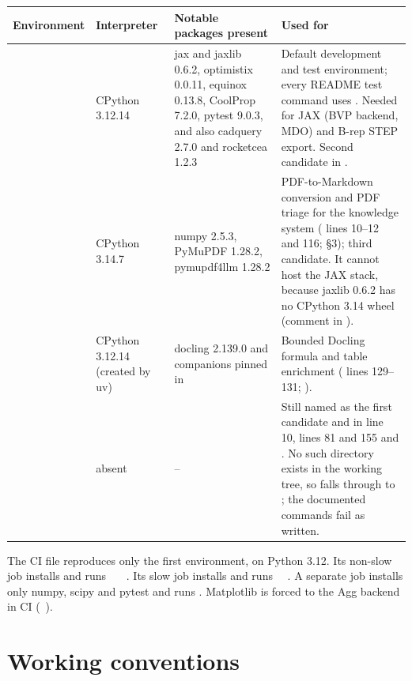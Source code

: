 {\small
\begin{longtable}{P{2.3cm}P{2.3cm}P{5.0cm}P{5.8cm}}
\toprule
Environment & Interpreter & Notable packages present & Used for \\
\midrule
\endhead
{} & CPython 3.12.14 & jax and jaxlib 0.6.2, optimistix 0.0.11, equinox 0.13.8, CoolProp 7.2.0, pytest 9.0.3, and also cadquery 2.7.0 and rocketcea 1.2.3 & Default development and test environment; every README test command uses . Needed for JAX (BVP backend, MDO) and B-rep STEP export. Second candidate in . \\
 & CPython 3.14.7 & numpy 2.5.3, PyMuPDF 1.28.2, pymupdf4llm 1.28.2 & PDF-to-Markdown conversion and PDF triage for the knowledge system ( lines 10--12 and 116;  §3); third  candidate. It cannot host the JAX stack, because jaxlib 0.6.2 has no CPython 3.14 wheel (comment in ). \\
 & CPython 3.12.14 (created by uv) & docling 2.139.0 and companions pinned in  & Bounded Docling formula and table enrichment ( lines 129--131; ). \\
 & absent & -- & Still named as the first  candidate and in  line 10,  lines 81 and 155 and . No such directory exists in the working tree, so  falls through to ; the documented  commands fail as written. \\
\bottomrule
\end{longtable}}

The CI file  reproduces only the first environment, on Python 3.12. Its non-slow job installs  and runs ~~~. Its slow job installs  and runs ~~. A separate job installs only numpy, scipy and pytest and runs . Matplotlib is forced to the Agg backend in CI (~).

\section{Working conventions}\label{sec:orient-conventions}

